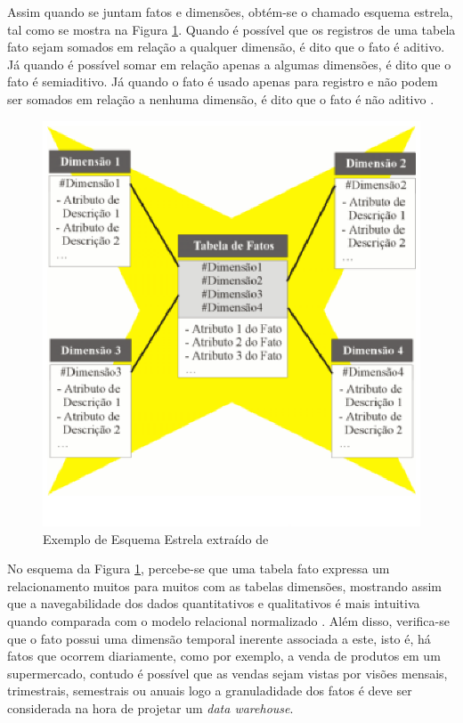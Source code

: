 Assim quando se juntam fatos e dimensões, obtém-se o chamado esquema estrela, tal como se mostra na Figura \ref{estrela}. Quando é possível que os registros de uma tabela fato sejam somados em relação a qualquer dimensão, é dito que o fato é aditivo. Já quando é possível somar em relação apenas a algumas dimensões, é dito que o fato é semiaditivo. Já quando o fato é usado apenas para registro e não podem ser somados em relação a nenhuma dimensão, é dito que o fato é não aditivo \cite{Inmon1992}.


\begin{figure}[h!]
\centering
\includegraphics[keepaspectratio=false,scale=1]{figuras/estrela.eps}
\caption{Exemplo de Esquema Estrela extraído de }
\label{estrela}
\end{figure}
\FloatBarrier


No esquema da Figura \ref{estrela}, percebe-se que uma tabela fato expressa um relacionamento muitos para muitos com as tabelas dimensões, mostrando assim que a navegabilidade dos dados quantitativos e qualitativos é mais intuitiva quando comparada com o modelo relacional normalizado \cite{Kimball2002}. Além disso, verifica-se que o fato possui uma dimensão temporal inerente associada a este, isto é, há fatos que ocorrem diariamente, como por exemplo, a venda de produtos em um supermercado, contudo é possível que as vendas sejam vistas por visões mensais, trimestrais, semestrais ou anuais logo a granuladidade dos fatos é deve ser considerada na hora de projetar um \textit{data warehouse}.




